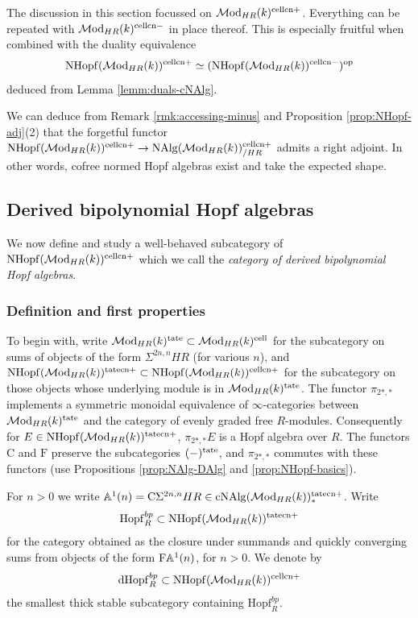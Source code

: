 \documentclass{amsart}
\numberwithin{proposition}{section}
\numberwithin{equation}{section}
\def\cell{\mathrm{cell}}
\def\tate{\mathrm{tate}}
\def\NHopf{\mathrm{NHopf}}
\def\Hopf{\mathrm{Hopf}}
\def\dHopf{\mathrm{dHopf}}
\def\Hopf{\mathrm{Hopf}}
\def\cNAlg{\mathrm{cNAlg}}
\def\cn{\mathrm{cn}}
\def\Free{\mathrm{F}}
\def\Cofree{\mathrm{C}}
\begin{document}
\begin{remark} \label{rmk:accessing-minus}
The discussion in this section focussed on $\Mod_{HR}(k)^{\cell\cn+}$.
Everything can be repeated with $\Mod_{HR}(k)^{\cell\cn-}$ in place thereof.
This is especially fruitful when combined with the duality equivalence \[ \NHopf(\Mod_{HR}(k))^{\cell\cn+} \wequi (\NHopf(\Mod_{HR}(k))^{\cell\cn-})^\op \] deduced from Lemma \ref{lemm:duals-cNAlg}.
\end{remark}

\begin{example} \label{ex:cofree-NHopf-alge}
We can deduce from Remark \ref{rmk:accessing-minus} and Proposition \ref{prop:NHopf-adj}(2) that the forgetful functor $\NHopf(\Mod_{HR}(k))^{\cell\cn+} \to \NAlg(\Mod_{HR}(k))^{\cell\cn+}_{/HR}$ admits a right adjoint.
In other words, cofree normed Hopf algebras exist and take the expected shape.
\end{example}

\subsection{Derived bipolynomial Hopf algebras}
We now define and study a well-behaved subcategory of $\NHopf(\Mod_{HR}(k))^{\cell\cn+}$ which we call the \emph{category of derived bipolynomial Hopf algebras}.

\subsubsection{Definition and first properties}
To begin with, write $\Mod_{HR}(k)^{\tate} \subset \Mod_{HR}(k)^{\cell}$ for the subcategory on sums of objects of the form $\Sigma^{2n,n}HR$ (for various $n$), and $\NHopf(\Mod_{HR}(k))^{\tate\cn+} \subset \NHopf(\Mod_{HR}(k))^{\cell\cn+}$ for the subcategory on those objects whose underlying module is in $\Mod_{HR}(k)^{\tate}$.
The functor $\pi_{2*,*}$ implements a symmetric monoidal equivalence of $\infty$-categories between $\Mod_{HR}(k)^{\tate}$ and the category of evenly graded free $R$-modules.
Consequently for $E \in \NHopf(\Mod_{HR}(k))^{\tate\cn+}$, $\pi_{2*,*}E$ is a Hopf algebra over $R$.
The functors $\Cofree$ and $\Free$ preserve the subcategories $(\ph)^\tate$, and $\pi_{2*,*}$ commutes with these functors (use Propositions \ref{prop:NAlg-DAlg} and \ref{prop:NHopf-basics}).

\begin{definition} \label{def:dhopfbp}
For $n>0$ we write $\A^1(n) = \Cofree \Sigma^{2n,n}HR \in \cNAlg(\Mod_{HR}(k))^{\tate\cn+}_*$.
Write \[ \Hopf_R^{bp} \subset \NHopf(\Mod_{HR}(k))^{\tate\cn+} \] for the category obtained as the closure under summands and quickly converging sums from objects of the form $\Free \A^1(n)$, for $n > 0$.
We denote by \[ \dHopf_R^{bp} \subset \NHopf(\Mod_{HR}(k))^{\cell\cn+} \] the smallest thick stable subcategory containing $\Hopf_R^{bp}$.
\end{definition}
\end{document}
